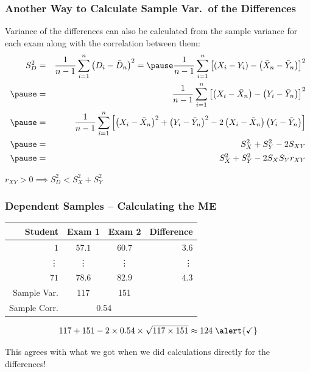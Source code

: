 \documentclass[handout]{beamer}
\begin{document}
\begin{frame}
\frametitle{Another Way to Calculate Sample Var.\ of the Differences}
\footnotesize
Variance of the differences can also be calculated from the sample variance for each exam along with the correlation between them:
\begin{eqnarray*}
	S_D^2&=& \frac{1}{n-1}\sum_{i=1}^n \left( D_i - \bar{D}_n\right)^2 = \pause \frac{1}{n-1}\sum_{i=1}^n \left[ \left( X_i - Y_i\right) - \left( \bar{X}_n - \bar{Y}_n\right)\right]^2\\ \pause
	&=&\frac{1}{n-1}\sum_{i=1}^n \left[ \left( X_i - \bar{X}_n\right) - \left( Y_i - \bar{Y}_n\right)\right]^2\\ \pause
	&=&\frac{1}{n-1}\sum_{i=1}^n \left[ \left( X_i - \bar{X}_n\right)^2 + \left( Y_i - \bar{Y}_n\right)^2 - 2\left(X_i - \bar{X}_n\right)\left(Y_i - \bar{Y}_n\right)\right]\\ \pause
	&=& S_X^2 + S_Y^2 - 2 S_{XY}\\ \pause
	&=& S_X^2 + S_Y^2 - 2 S_X S_Y r_{XY}
\end{eqnarray*}

\vspace{1em}
\alert{$\boxed{r_{XY} > 0 \implies S_D^2 < S_X^2 + S_Y^2}$}

\end{frame}
\begin{frame}
\frametitle{Dependent Samples -- Calculating the ME}
%
\begin{table}[!tbp]
\begin{center}
\begin{tabular}{rccr}
\hline\hline
\multicolumn{1}{r}{Student}&\multicolumn{1}{c}{Exam 1}&\multicolumn{1}{c}{Exam 2}&\multicolumn{1}{r}{Difference}\tabularnewline
\hline
$ 1$&$57.1$&$60.7$&$  3.6$\tabularnewline
\vdots&\vdots&\vdots&\vdots\\
$71$&$78.6$&$82.9$&$  4.3$\tabularnewline
\hline
Sample Var. &117  & 151 & \alert{\fbox{?}}\\
Sample Corr.& \multicolumn{2}{c}{0.54}&\\
\hline
\end{tabular}
\end{center}
\end{table}

$$117 + 151 - 2 \times 0.54 \times \sqrt{117 \times 151} \approx 124   \;\alert{\checkmark}$$

\alert{This agrees with what we got when we did calculations directly for the differences!}
\end{frame}
\end{document}
